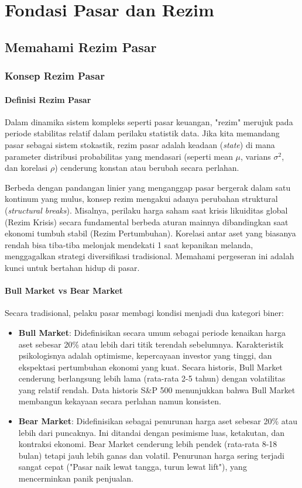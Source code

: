 \documentclass[12pt,a4paper]{book}
\begin{document}
\part{Fondasi Pasar dan Rezim}

\chapter{Memahami Rezim Pasar}
\section{Konsep Rezim Pasar}
\subsection{Definisi Rezim Pasar}
Dalam dinamika sistem kompleks seperti pasar keuangan, "rezim" merujuk pada periode stabilitas relatif dalam perilaku statistik data. Jika kita memandang pasar sebagai sistem stokastik, rezim pasar adalah keadaan (\textit{state}) di mana parameter distribusi probabilitas yang mendasari (seperti mean $\mu$, varians $\sigma^2$, dan korelasi $\rho$) cenderung konstan atau berubah secara perlahan.

Berbeda dengan pandangan linier yang menganggap pasar bergerak dalam satu kontinum yang mulus, konsep rezim mengakui adanya perubahan struktural (\textit{structural breaks}). Misalnya, perilaku harga saham saat krisis likuiditas global (Rezim Krisis) secara fundamental berbeda aturan mainnya dibandingkan saat ekonomi tumbuh stabil (Rezim Pertumbuhan). Korelasi antar aset yang biasanya rendah bisa tiba-tiba melonjak mendekati 1 saat kepanikan melanda, menggagalkan strategi diversifikasi tradisional. Memahami pergeseran ini adalah kunci untuk bertahan hidup di pasar.

\subsection{Bull Market vs Bear Market}
Secara tradisional, pelaku pasar membagi kondisi menjadi dua kategori biner:
\begin{itemize}
    \item \textbf{Bull Market}: Didefinisikan secara umum sebagai periode kenaikan harga aset sebesar 20\% atau lebih dari titik terendah sebelumnya. Karakteristik psikologisnya adalah optimisme, kepercayaan investor yang tinggi, dan ekspektasi pertumbuhan ekonomi yang kuat. Secara historis, Bull Market cenderung berlangsung lebih lama (rata-rata 2-5 tahun) dengan volatilitas yang relatif rendah. Data historis S\&P 500 menunjukkan bahwa Bull Market membangun kekayaan secara perlahan namun konsisten.
    \item \textbf{Bear Market}: Didefinisikan sebagai penurunan harga aset sebesar 20\% atau lebih dari puncaknya. Ini ditandai dengan pesimisme luas, ketakutan, dan kontraksi ekonomi. Bear Market cenderung lebih pendek (rata-rata 8-18 bulan) tetapi jauh lebih ganas dan volatil. Penurunan harga sering terjadi sangat cepat ("Pasar naik lewat tangga, turun lewat lift"), yang mencerminkan panik penjualan.
\end{itemize}
\end{document}
